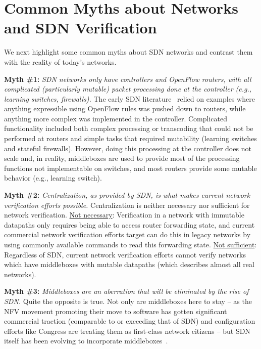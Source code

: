 \section{Common Myths about Networks and SDN Verification}

We next highlight some common myths about SDN networks and contrast them with the reality of today's networks.

\medskip{}

{\noindent \bf Myth \#1:} \emph{SDN networks only have controllers and OpenFlow routers, with all complicated (particularly mutable) packet processing done at the controller (e.g., learning switches, firewalls).} The early SDN literature~\cite{gude2008nox, monsanto2013composing} relied on examples where anything expressible using OpenFlow rules was pushed down to routers, while anything more complex was implemented in the controller. Complicated functionality
included both complex processing or transcoding that could not be performed at routers and simple tasks that required mutability (\eg learning switches and stateful firewalls). However, doing this processing at the controller does not scale and, in reality, middleboxes are used to provide most
of the processing functions not implementable on switches, and most routers provide some mutable behavior (e.g., learning switch).

{\noindent \bf Myth \#2:} \emph{Centralization, as provided by SDN, is what makes current network verification efforts possible.} Centralization is neither necessary nor sufficient for network verification. {\underline{Not necessary}:} Verification in a network with immutable datapaths only requires being able to access router forwarding state, and current commercial network verification efforts target can do this in legacy networks by using commonly available commands to read this forwarding state. {\underline{Not sufficient}:} Regardless of SDN, current network verification efforts cannot verify networks which have middleboxes with mutable datapaths (which describes almost all real networks).

{\noindent \bf Myth \#3:} \emph{Middleboxes are an aberration that will be eliminated by the rise of SDN.} Quite the opposite is true. Not only are middleboxes here to stay -- as the NFV movement promoting their move to software has gotten significant commercial traction (comparable to or exceeding that of SDN) and configuration efforts like Congress \cite{congress} are treating them as first-class network citizens -- but SDN itself has been evolving to incorporate middleboxes~\cite{scottI2talk}.

